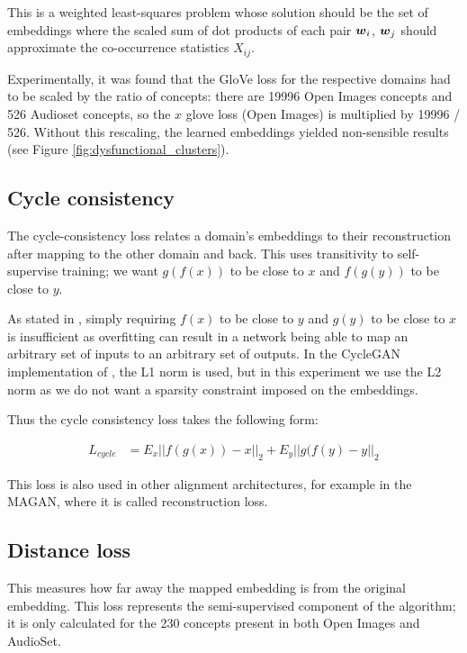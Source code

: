 This is a weighted least-squares problem whose solution should be the set of embeddings where the scaled sum of dot products of each pair $\boldsymbol{w}_i$, $\boldsymbol{w}_j$ should approximate the co-occurrence statistics $X_{ij}$. 

Experimentally, it was found that the GloVe loss for the respective domains had to be scaled by the ratio of concepts: there are 19996 Open Images concepts and 526 Audioset concepts, so the $x$ glove loss (Open Images) is multiplied by 19996 / 526. Without this rescaling, the learned embeddings yielded non-sensible results (see Figure \ref{fig:dysfunctional_clusters}). 

\subsection{Cycle consistency}

The cycle-consistency loss relates a domain's embeddings to their reconstruction after mapping to the other domain and back. This uses transitivity to self-supervise training; we want $g(f(x))$ to be close to $x$ and $f(g(y))$ to be close to $y$. 

As stated in \cite{CycleGAN}, simply requiring $f(x)$ to be close to $y$ and $g(y)$ to be close to $x$ is insufficient as overfitting can result in a network being able to map an arbitrary set of inputs to an arbitrary set of outputs. In the CycleGAN implementation of \cite{CycleGAN}, the L1 norm is used, but in this experiment we use the L2 norm as we do not want a sparsity constraint imposed on the embeddings. 

Thus the cycle consistency loss takes the following form:

\begin{equation*}
\begin{split}
L_{cycle} &= E_x ||f(g(x)) - x||_2 + E_y ||g(f(y) - y||_2
\end{split}
\end{equation*}

This loss is also used in other alignment architectures, for example in the MAGAN, \cite{magan} where it is called reconstruction loss. 

\subsection{Distance loss}

This measures how far away the mapped embedding is from the original embedding. This loss represents the semi-supervised component of the algorithm; it is only calculated for the 230 concepts present in both Open Images and AudioSet.

